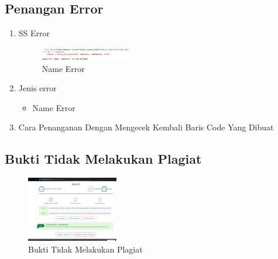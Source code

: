 \subsection{Penangan Error}
\begin{enumerate}
	\item SS Error
	\hfill\break
		\begin{figure}[H]
			\includegraphics[width=4cm]{figures/1174017/error/5_name_error.png}
			\centering
			\caption{Name Error}
		\end{figure}
	\item Jenis error
	\begin{itemize}
		\item Name Error
	\end{itemize}
	\item Cara Penanganan
	\hfill\break
	Dengan Mengecek Kembali Baris Code Yang Dibuat
\end{enumerate}
\subsection{Bukti Tidak Melakukan Plagiat}
\hfill\break
\begin{figure}[H]
	\includegraphics[width=4cm]{figures/1174017/bukti/5.png}
	\centering
	\caption{Bukti Tidak Melakukan Plagiat}
\end{figure}